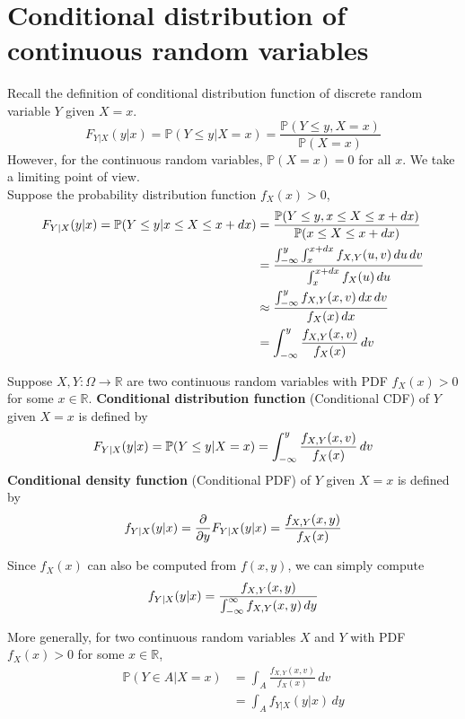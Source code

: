 \documentclass{huhtakm-template-book}
\newcommand{\prob}{\mathbb{P}}
\begin{document}
\section{Conditional distribution of continuous random variables}
Recall the definition of conditional distribution function of discrete random variable $Y$ given $X=x$.
\begin{equation*}
	F_{Y|X}(y|x)=\prob(Y\leq y|X=x)=\frac{\prob(Y\leq y,X=x)}{\prob(X=x)}
\end{equation*}
However, for the continuous random variables, $\prob(X=x)=0$ for all $x$. We take a limiting point of view.\\
Suppose the probability distribution function $f_{X}(x)>0$,
\begin{align*}
	F_{Y|X}(y|x)=\prob(Y\leq y|x\leq X\leq x+dx)&=\frac{\prob(Y\leq y,x\leq X\leq x+dx)}{\prob(x\leq X\leq x+dx)}\\
	&=\frac{\intlu{-\infty}{y}\intlu{x}{x+dx}f_{X,Y}(u,v)\,du\,dv}{\intlu{x}{x+dx}f_{X}(u)\,du}\\
	&\approx\frac{\intlu{-\infty}{y}f_{X,Y}(x,v)\,dx\,dv}{f_{X}(x)\,dx}\\
	&=\intlu{-\infty}{y}\frac{f_{X,Y}(x,v)}{f_{X}(x)}\,dv
\end{align*}
\begin{defn}
	Suppose $X,Y:\Omega\to\mathbb{R}$ are two continuous random variables with PDF $f_{X}(x)>0$ for some 
	$x\in\mathbb{R}$. \textbf{Conditional distribution function} (Conditional CDF) of $Y$ given $X=x$ is defined by
	\begin{equation*}
		F_{Y|X}(y|x)=\prob(Y\leq y|X=x)=\intlu{-\infty}{y}\frac{f_{X,Y}(x,v)}{f_{X}(x)}\,dv
	\end{equation*}
	\textbf{Conditional density function} (Conditional PDF) of $Y$ given $X=x$ is defined by
	\begin{equation*}
		f_{Y|X}(y|x)=\pdv*{F_{Y|X}(y|x)}{y}=\frac{f_{X,Y}(x,y)}{f_{X}(x)}
	\end{equation*}
\end{defn}
\begin{rem}
	Since $f_{X}(x)$ can also be computed from $f(x,y)$, we can simply compute
	\begin{equation*}
		f_{Y|X}(y|x)=\frac{f_{X,Y}(x,y)}{\int_{-\infty}^{\infty} f_{X,Y}(x,y)\,dy}
	\end{equation*}
\end{rem}
\begin{rem}
	More generally, for two continuous random variables $X$ and $Y$ with PDF  $f_{X}(x)>0$ for some $x\in\mathbb{R}$,
	\begin{align*}
		\prob(Y\in A|X=x)&=\int_{A}\frac{f_{X,Y}(x,v)}{f_{X}(x)}\,dv\\
		&=\int_{A}f_{Y|X}(y|x)\,dy
	\end{align*}
\end{rem}
\end{document}
